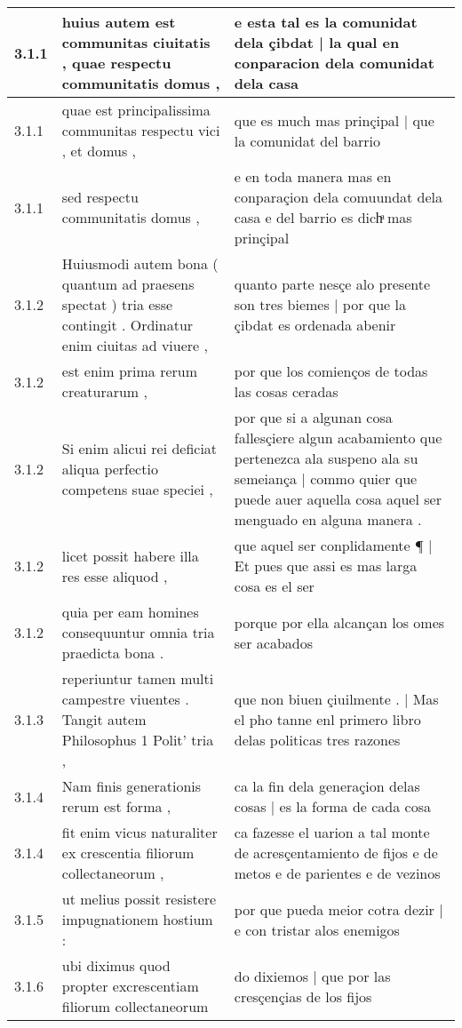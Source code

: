 \begin{tabular}{|p{1cm}|p{6.5cm}|p{6.5cm}|}
3.1.1 & huius autem est communitas ciuitatis , quae respectu communitatis domus , & e esta tal es la comunidat dela çibdat | la qual en conparacion dela comunidat dela casa \\\hline
3.1.1 & quae est principalissima communitas respectu vici , et domus , & que es much mas prinçipal | que la comunidat del barrio \\\hline
3.1.1 & sed respectu communitatis domus , & e en toda manera mas en conparaçion dela comuundat dela casa e del barrio es dichͣ mas prinçipal \\\hline
3.1.2 & Huiusmodi autem bona ( quantum ad praesens spectat ) tria esse contingit . Ordinatur enim ciuitas ad viuere , & quanto parte nesçe alo presente son tres biemes | por que la çibdat es ordenada abenir \\\hline
3.1.2 & est enim prima rerum creaturarum , & por que los comienços de todas las cosas ceradas \\\hline
3.1.2 & Si enim alicui rei deficiat aliqua perfectio competens suae speciei , & por que si a algunan cosa fallesçiere algun acabamiento que pertenezca ala suspeno ala su semeiança | commo quier que puede auer aquella cosa aquel ser menguado en alguna manera . \\\hline
3.1.2 & licet possit habere illa res esse aliquod , & que aquel ser conplidamente ¶ | Et pues que assi es mas larga cosa es el ser \\\hline
3.1.2 & quia per eam homines consequuntur omnia tria praedicta bona . & porque por ella alcançan los omes ser acabados \\\hline
3.1.3 & reperiuntur tamen multi campestre viuentes . Tangit autem Philosophus 1 Polit’ tria , & que non biuen çiuilmente . | Mas el pho tanne enl primero libro delas politicas tres razones \\\hline
3.1.4 & Nam finis generationis rerum est forma , & ca la fin dela generaçion delas cosas | es la forma de cada cosa \\\hline
3.1.4 & fit enim vicus naturaliter ex crescentia filiorum collectaneorum , & ca fazesse el uarion a tal monte de acresçentamiento de fijos e de metos e de parientes e de vezinos \\\hline
3.1.5 & ut melius possit resistere impugnationem hostium : & por que pueda meior cotra dezir | e con tristar alos enemigos \\\hline
3.1.6 & ubi diximus quod propter excrescentiam filiorum collectaneorum & do dixiemos | que por las cresçençias de los fijos \\\hline

\end{tabular}
